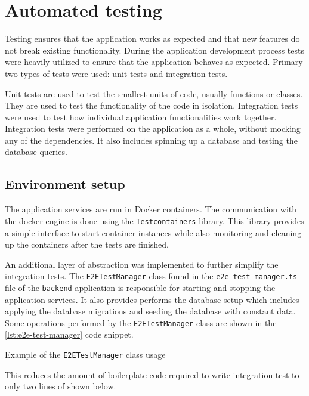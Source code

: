 \documentclass[../main.tex]{subfiles}
\begin{document}
\section{Automated testing}

Testing ensures that the application works as expected and that new features do not break existing functionality.
During the application development process tests were heavily utilized to ensure that the application behaves as expected.
Primary two types of tests were used: unit tests and integration tests.

Unit tests are used to test the smallest units of code, usually functions or classes. They are used to test the functionality of the code in isolation.
Integration tests were used to test how individual application functionalities work together. Integration tests were performed on the application as a whole, without mocking any of the dependencies.
It also includes spinning up a database and testing the database queries.

\subsection{Environment setup}

The application services are run in Docker containers. The communication with the docker engine is done using the \texttt{Testcontainers} library.
This library provides a simple interface to start container instances while also monitoring and cleaning up the containers after the tests are finished.

An additional layer of abstraction was implemented to further simplify the integration tests. The \texttt{E2ETestManager} class
found in the \texttt{e2e-test-manager.ts} file of the \texttt{backend} application is responsible for starting
and stopping the application services. It also provides performs the database setup which includes applying the database migrations and seeding the database with constant data.
Some operations performed by the \texttt{E2ETestManager} class are shown in the \ref{lst:e2e-test-manager} code snippet.

\begin{listing}[H]
  \caption{Example of the \texttt{E2ETestManager} class usage}
  \label{lst:e2e-test-manager}
\end{listing}

This reduces the amount of boilerplate code required to write integration test to only two lines of shown below.
\end{document}
